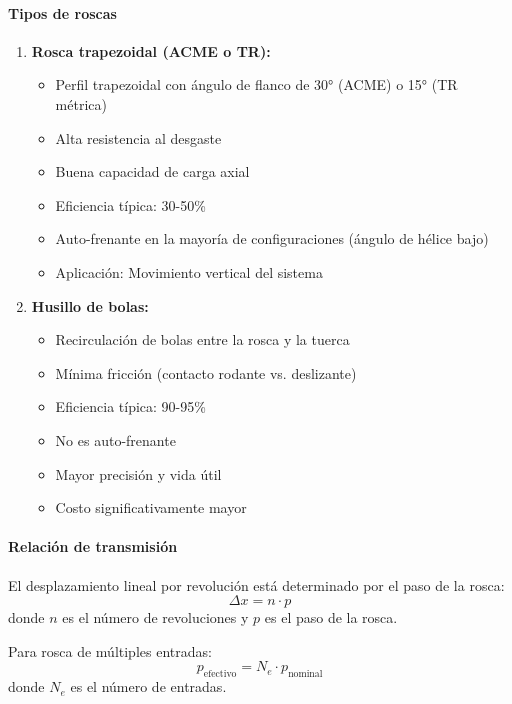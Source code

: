 \paragraph{Tipos de roscas}
\begin{enumerate}
    \item \textbf{Rosca trapezoidal (ACME o TR):}
    \begin{itemize}
        \item Perfil trapezoidal con ángulo de flanco de 30° (ACME) o 15° (TR métrica)
        \item Alta resistencia al desgaste
        \item Buena capacidad de carga axial
        \item Eficiencia típica: 30-50\%
        \item Auto-frenante en la mayoría de configuraciones (ángulo de hélice bajo)
        \item Aplicación: Movimiento vertical del sistema
    \end{itemize}

    \item \textbf{Husillo de bolas:}
    \begin{itemize}
        \item Recirculación de bolas entre la rosca y la tuerca
        \item Mínima fricción (contacto rodante vs. deslizante)
        \item Eficiencia típica: 90-95\%
        \item No es auto-frenante
        \item Mayor precisión y vida útil
        \item Costo significativamente mayor
    \end{itemize}
\end{enumerate}

\paragraph{Relación de transmisión}
El desplazamiento lineal por revolución está determinado por el paso de la rosca:
\begin{equation}
    \Delta x = n \cdot p
\end{equation}
donde $n$ es el número de revoluciones y $p$ es el paso de la rosca.

Para rosca de múltiples entradas:
\begin{equation}
    p_{\text{efectivo}} = N_e \cdot p_{\text{nominal}}
\end{equation}
donde $N_e$ es el número de entradas.

